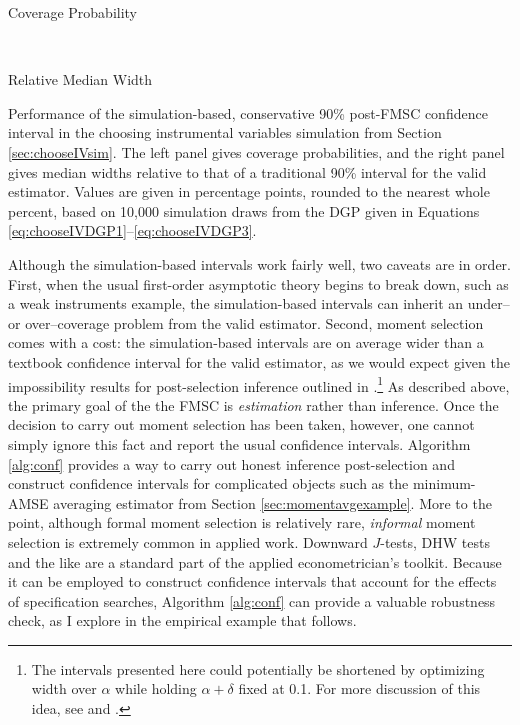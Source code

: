 \begin{table}[h]
\footnotesize
\centering
	\begin{subtable}{0.48\textwidth}
		\caption{Coverage Probability}
		\label{tab:chooseIVsim_cover_FMSC}
		
	\end{subtable}	
	~
	\begin{subtable}{0.48\textwidth}
		\caption{Relative Median Width}
		\label{tab:chooseIVsim_width_FMSC}
		
	\end{subtable}
\caption{Performance of the simulation-based, conservative 90\% post-FMSC confidence interval in the choosing instrumental variables simulation from Section \ref{sec:chooseIVsim}. The left panel gives coverage probabilities, and the right panel gives median widths relative to that of a traditional 90\% interval for the valid estimator. Values are given in percentage points, rounded to the nearest whole percent, based on 10,000 simulation draws from the DGP given in Equations \ref{eq:chooseIVDGP1}--\ref{eq:chooseIVDGP3}.}
\end{table}

Although the simulation-based intervals work fairly well, two caveats are in order.
First, when the usual first-order asymptotic theory begins to break down, such as a weak instruments example, the simulation-based intervals can inherit an under-- or over--coverage problem from the valid estimator.
Second, moment selection comes with a cost: the simulation-based intervals are on average wider than a textbook confidence interval for the valid estimator, as we would expect given the impossibility results for post-selection inference outlined in \cite{LeebPoetscher2005}.\footnote{The intervals presented here could potentially be shortened by optimizing width over $\alpha$ while holding $\alpha + \delta$ fixed at 0.1. For more discussion of this idea, see \cite{ClaeskensHjortbook} and \cite{McCloskey}.}
As described above, the primary goal of the the FMSC is \emph{estimation} rather than inference.
Once the decision to carry out moment selection has been taken, however, one cannot simply ignore this fact and report the usual confidence intervals.
Algorithm \ref{alg:conf} provides a way to carry out honest inference post-selection and construct confidence intervals for complicated objects such as the minimum-AMSE averaging estimator from Section \ref{sec:momentavgexample}.
More to the point, although formal moment selection is relatively rare, \emph{informal} moment selection is extremely common in applied work.
Downward $J$-tests, DHW tests and the like are a standard part of the applied econometrician's toolkit.
Because it can be employed to construct confidence intervals that account for the effects of specification searches, Algorithm \ref{alg:conf} can provide a valuable robustness check, as I explore in the empirical example that follows.
